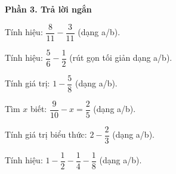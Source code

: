 \textbf{Phần 3. Trả lời ngắn}

\begin{ex} %
Tính hiệu: $\dfrac{8}{11} - \dfrac{3}{11}$ (dạng a/b).
\end{ex}

\begin{ex} %
Tính hiệu: $\dfrac{5}{6} - \dfrac{1}{2}$ (rút gọn tối giản dạng a/b).
\end{ex}

\begin{ex} %
Tính giá trị: $1 - \dfrac{5}{8}$ (dạng a/b).
\end{ex}

\begin{ex} %
Tìm $x$ biết: $\dfrac{9}{10} - x = \dfrac{2}{5}$ (dạng a/b).
\end{ex}

\begin{ex} %
Tính giá trị biểu thức: $2 - \dfrac{2}{3}$ (dạng a/b).
\end{ex}

\begin{ex} %
Tính hiệu: $1 - \dfrac{1}{2} - \dfrac{1}{4} - \dfrac{1}{8}$ (dạng a/b).
\end{ex}
